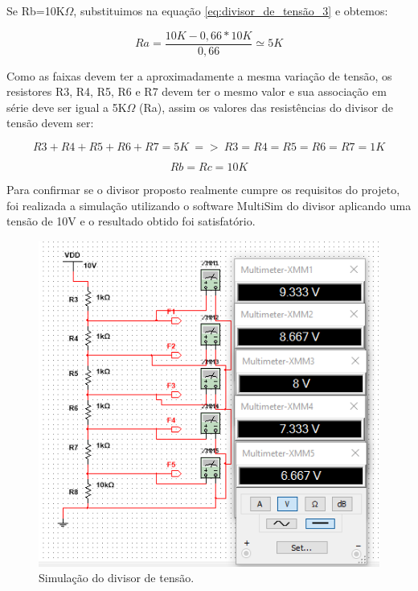 		Se Rb=10K$\Omega$, substituimos na equação \ref{eq:divisor_de_tensão_3} e obtemos:

		\begin{equation}
		\label{eq:divisor_de_tensão_4}
			Ra=\frac{10K - 0,66 * 10K}{0,66} \simeq 5K
		\end{equation}

		Como as faixas devem ter a aproximadamente a mesma variação de tensão, os resistores R3, R4, R5, R6 e R7 devem ter o mesmo valor e sua associação em série deve ser igual a 5K$\Omega$ (Ra), assim os valores das resistências do divisor de tensão devem ser:

		\begin{equation}
		\label{eq:divisor_de_tensão_5}
			R3 + R4 + R5 + R6 + R7 = 5K\ =>\  
			R3 = R4 = R5 = R6 = R7 = 1K
		\end{equation}

		\begin{equation}
		\label{eq:divisor_de_tensão_6}
			Rb = Rc = 10K
		\end{equation}

		Para confirmar se o divisor proposto realmente cumpre os requisitos do projeto, foi realizada a simulação utilizando o software MultiSim do divisor aplicando uma tensão de 10V e o resultado obtido foi satisfatório.

		\begin{figure}[H]
			\centering
			\includegraphics[scale=0.8]{figuras/Divisor1_simu.png}
			\caption{Simulação do divisor de tensão.}
			\label{img:divisor_de_tesnão_simulado}
		\end{figure}


